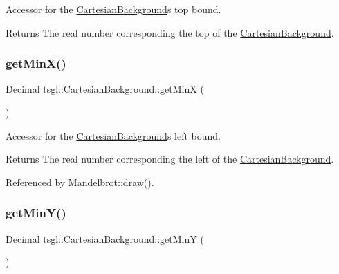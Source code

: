 Accessor for the \hyperlink{classtsgl_1_1_cartesian_background}{Cartesian\+Background}\textquotesingle{}s top bound. 

\begin{DoxyReturn}{Returns}
The real number corresponding the top of the \hyperlink{classtsgl_1_1_cartesian_background}{Cartesian\+Background}. 
\end{DoxyReturn}
\mbox{\label{classtsgl_1_1_cartesian_background_a8bc9825516fb188932a992a5ad6baf49}} 
\subsubsection{\texorpdfstring{get\+Min\+X()}{getMinX()}}
{\footnotesize\ttfamily Decimal tsgl\+::\+Cartesian\+Background\+::get\+MinX (\begin{DoxyParamCaption}{ }\end{DoxyParamCaption})\hspace{0.3cm}{\ttfamily [inline]}}



Accessor for the \hyperlink{classtsgl_1_1_cartesian_background}{Cartesian\+Background}\textquotesingle{}s left bound. 

\begin{DoxyReturn}{Returns}
The real number corresponding the left of the \hyperlink{classtsgl_1_1_cartesian_background}{Cartesian\+Background}. 
\end{DoxyReturn}


Referenced by Mandelbrot\+::draw().

\mbox{\label{classtsgl_1_1_cartesian_background_a732052e2af266586179855eea5b45361}} 
\subsubsection{\texorpdfstring{get\+Min\+Y()}{getMinY()}}
{\footnotesize\ttfamily Decimal tsgl\+::\+Cartesian\+Background\+::get\+MinY (\begin{DoxyParamCaption}{ }\end{DoxyParamCaption})\hspace{0.3cm}{\ttfamily [inline]}}



